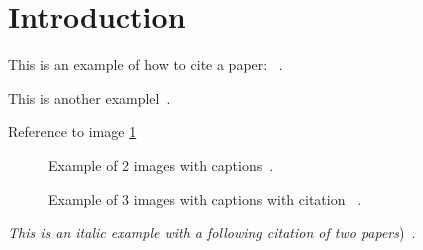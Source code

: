 \section{Introduction}

This is an example of how to cite a paper: ~\cite{Almeida2003}. 

This is another examplel~\cite{Book01,Bacellar2007}.

Reference to image \ref{fig:img1}

\begin{figure}[!htb]
\centering
{}
\caption{Example of 2 images with captions~\cite{Silva2009}.}

\label{fig:img1}
\end{figure}

\begin{figure}[!htb]
\centering
{}
\caption{Example of 3 images with captions with citation ~\cite{Silva2009}.}
\label{fig:img2}
\end{figure}

\textit{This is an italic example with a following citation of two papers})~\cite{Patti2001, Zibetti2007}. 
